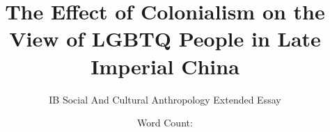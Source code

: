 \documentclass[12pt]{turabian-researchpaper}
\title{The Effect of Colonialism on the View of LGBTQ People in Late Imperial China}
\author{IB Social And Cultural Anthropology Extended Essay}
\date{Word Count: }
\begin{document}
\begin{titlepage}
    \maketitle
\end{titlepage}

\tableofcontents
{}

\newpage
{}



\newpage

\printbibliography
\end{document}
